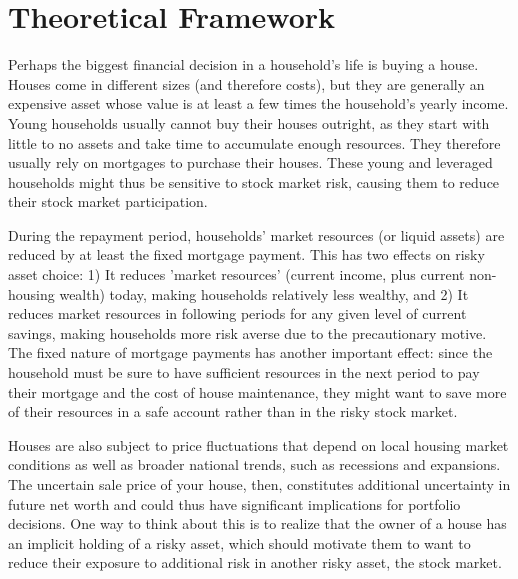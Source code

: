 
  \section{Theoretical Framework}

  Perhaps the biggest financial decision in a household's life is buying a house. Houses come in different sizes (and therefore costs), but they are generally an expensive asset whose value is at least a few times the household's yearly income. Young households usually cannot buy their houses outright, as they start with little to no assets and take time to accumulate enough resources. They therefore usually rely on mortgages to purchase their houses. These young and leveraged households might thus be sensitive to stock market risk, causing them to reduce their stock market participation.

  During the repayment period, households' market resources (or liquid assets) are reduced by at least the fixed mortgage payment. This has two effects on risky asset choice: 1) It reduces 'market resources' (current income, plus current non-housing wealth) today, making households relatively less wealthy, and 2) It reduces market resources in following periods for any given level of current savings, making households more risk averse due to the precautionary motive. The fixed nature of mortgage payments has another important effect: since the household must be sure to have sufficient resources in the next period to pay their mortgage and the cost of house maintenance, they might want to save more of their resources in a safe account rather than in the risky stock market.

  Houses are also subject to price fluctuations that depend on local housing market conditions as well as broader national trends, such as recessions and expansions. The uncertain sale price of your house, then, constitutes additional uncertainty in future net worth and could thus have significant implications for portfolio decisions. One way to think about this is to realize that the owner of a house has an implicit holding of a risky asset, which should motivate them to want to reduce their exposure to additional risk in another risky asset, the stock market.

